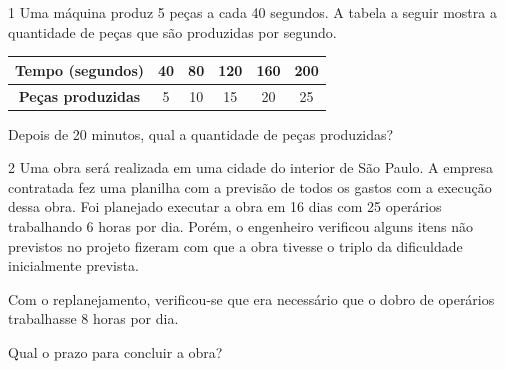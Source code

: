 \begin{escolha}
\begin{escolha}
\num{1} Uma máquina produz 5 peças a cada 40 segundos. A tabela a seguir
mostra a quantidade de peças que são produzidas por segundo.

\begin{center}
\begin{tabular}{|c ccccc|}
\hline
\textbf{Tempo (segundos)} & 40 & 80 & 120 & 160 & 200 \\ \hline
\textbf{Peças produzidas} & 5 & 10 & 15 & 20 & 25 \\ \hline
\end{tabular}
\end{center}

Depois de 20 minutos, qual a quantidade de peças produzidas?

\begin{boxpeq}
\end{boxpeq}

\num{2} Uma obra será realizada em uma cidade do interior de São Paulo. A
empresa contratada fez uma planilha com a previsão de todos os gastos
com a execução dessa obra. Foi planejado executar a obra em 16 dias com
25 operários trabalhando 6 horas por dia. Porém, o engenheiro verificou
alguns itens não previstos no projeto fizeram com que a obra tivesse o
triplo da dificuldade inicialmente prevista.

Com o replanejamento, verificou-se que era necessário que o dobro de
operários trabalhasse 8 horas por dia.

Qual o prazo para concluir a obra?

\begin{boxmedio}
\end{boxmedio}
\end{escolha}
\end{escolha}
